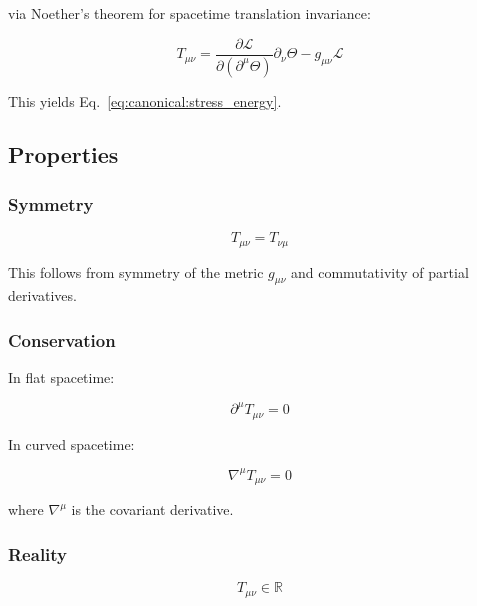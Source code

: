 via Noether's theorem for spacetime translation invariance:

\begin{equation}
\label{eq:canonical:stress_energy_noether}
T_{\mu\nu} = \frac{\partial\mathcal{L}}{\partial(\partial^\mu\Theta)} \partial_\nu\Theta - g_{\mu\nu}\mathcal{L}
\end{equation}

This yields Eq.~\ref{eq:canonical:stress_energy}.

\subsection{Properties}

\subsubsection{Symmetry}

\begin{equation}
\label{eq:canonical:stress_symmetry}
T_{\mu\nu} = T_{\nu\mu}
\end{equation}

This follows from symmetry of the metric $g_{\mu\nu}$ and commutativity of partial derivatives.

\subsubsection{Conservation}

In flat spacetime:

\begin{equation}
\label{eq:canonical:stress_conservation_flat}
\partial^\mu T_{\mu\nu} = 0
\end{equation}

In curved spacetime:

\begin{equation}
\label{eq:canonical:stress_conservation_curved}
\nabla^\mu T_{\mu\nu} = 0
\end{equation}

where $\nabla^\mu$ is the covariant derivative.

\subsubsection{Reality}

\begin{equation}
\label{eq:canonical:stress_reality}
T_{\mu\nu} \in \mathbb{R}
\end{equation}

